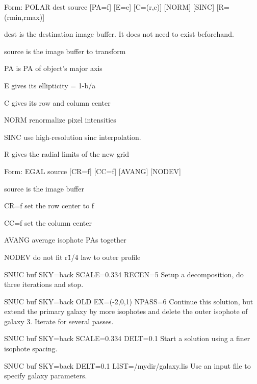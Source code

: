 {\newpage\clearpage
{}%
\begin{command}
  \item[Form: POLAR dest source {[PA=f]} {[E=e]} {[C=(r,c)]} {[NORM]} 
       {[SINC]} {[R=(rmin,rmax)]}\hfill]{}
  \item[dest]{is the destination image buffer. It does not need
       to exist beforehand.}
  \item[source]{is the image buffer to transform}
  \item[PA]{is PA of object's major axis}
  \item[E]{gives its ellipticity = 1-b/a}
  \item[C]{gives its row and column center}
  \item[NORM]{renormalize pixel intensities}
  \item[SINC]{use high-resolution sinc interpolation.}
  \item[R]{gives the radial limits of the new grid}
\end{command}%
\lthtmlfigureZ
\lthtmlcheckvsize\clearpage}

{\newpage\clearpage
{}%
\begin{command}
  \item[Form: EGAL source {[CR=f]} {[CC=f]} {[AVANG]} {[NODEV]}\hfill]{}
  \item[source]{is the image buffer}
  \item[CR=f]{set the row center to f}
  \item[CC=f]{set the column center}
  \item[AVANG]{average isophote PAs together}
  \item[NODEV]{do not fit r\^1/4 law to outer profile}
\end{command}%
\lthtmlfigureZ
\lthtmlcheckvsize\clearpage}

{\newpage\clearpage
{}%
\begin{example}
  \item[SNUC buf SKY=back SCALE=0.334 RECEN=5\hfill]{Setup a
       decomposition, do three iterations and stop.}
\par\item[SNUC buf SKY=back OLD EX=(-2,0,1) NPASS=6\hfill]{Continue this
       solution, but extend the primary galaxy by more isophotes and delete
       the outer isophote of galaxy 3.  Iterate for several passes.}
\par\item[SNUC buf SKY=back SCALE=0.334 DELT=0.1\hfill]{Start a solution
       using a finer isophote spacing.}
\par\item[SNUC buf SKY=back DELT=0.1 LIST=/mydir/galaxy.lis\hfill]{Use an
       input file to specify galaxy parameters.}
\end{example}%
\lthtmlfigureZ
\lthtmlcheckvsize\clearpage}

